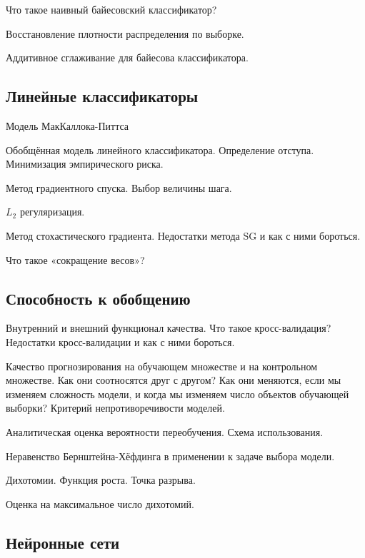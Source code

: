 \documentclass[a4paper,12pt]{article}
\begin{document}
  \myparagraph Что такое наивный байесовский классификатор?  

  \myparagraph Восстановление плотности распределения по выборке.
  
  \myparagraph Аддитивное сглаживание для байесова классификатора.
  
  \subsection*{Линейные классификаторы}
  
  \myparagraph Модель МакКаллока-Питтса   
  
  \myparagraph Обобщённая модель линейного классификатора. Определение отступа. Минимизация эмпирического риска.

  \myparagraph Метод градиентного спуска. Выбор величины шага.
  
  \myparagraph $L_2$ регуляризация.

  \myparagraph Метод стохастического градиента. Недостатки метода SG и как с ними бороться.
  
  \myparagraph Что такое «сокращение весов»?

  \subsection*{Способность к обобщению}
  
  \myparagraph Внутренний и внешний функционал качества. Что такое кросс-валидация? Недостатки кросс-валидации и как с ними бороться.  
  
  \myparagraph Качество прогнозирования на обучающем множестве и на контрольном множестве. Как они соотносятся друг с другом? Как они меняются, если мы изменяем сложность модели, и когда мы изменяем число объектов обучающей выборки? Критерий непротиворечивости моделей.

  \myparagraph Аналитическая оценка вероятности переобучения. Схема использования. 
  
  \myparagraph Неравенство Бернштейна-Хёфдинга в применении к задаче выбора модели.
  
  \myparagraph Дихотомии. Функция роста. Точка разрыва.
  
  \myparagraph Оценка на максимальное число дихотомий.
  
  \subsection*{Нейронные сети}
  
\end{document}
